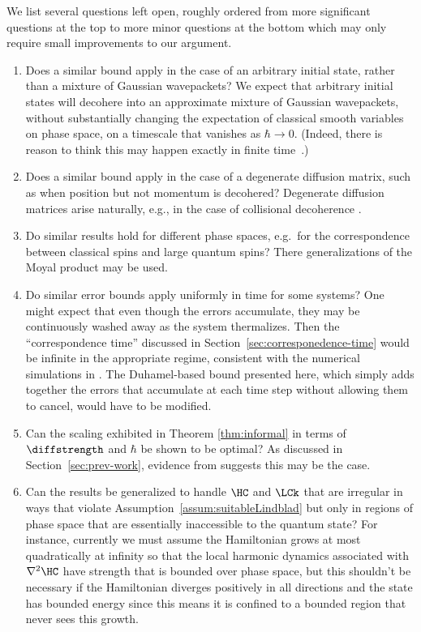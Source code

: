 \documentclass{article}
\numberwithin{equation}{section}
\begin{document}
We list several questions left open, roughly ordered from more significant questions at the top to more minor questions at the bottom which may only require small improvements to our argument.
\begin{enumerate}
    \item  Does a similar bound apply in the case of an arbitrary initial state, rather than a mixture of Gaussian wavepackets? We expect that arbitrary initial states will decohere into an approximate mixture of Gaussian wavepackets, without substantially changing the expectation of classical smooth variables on phase space, on a timescale that vanishes as $\hbar\to 0$.  (Indeed, there is reason to think this may happen exactly in finite time~\cite{diosi2002exact, brodier2004symplectic, eisert2004exact, riedel2016quantum}.) 
    \item Does a similar bound apply in the case of a degenerate diffusion matrix, such as when position but not momentum is decohered? Degenerate diffusion matrices arise naturally, e.g., in the case of collisional decoherence \cite{joos1985emergence, gallis1990environmental, schlosshauer2008decoherence}. 
    \item Do similar results hold for different phase spaces, e.g.\ for the correspondence between classical spins and large quantum spins? There generalizations of the Moyal product may be used. 
    \item Do similar error bounds apply uniformly in time for some systems?  One might expect that even though the errors accumulate, they may be continuously washed away as the system thermalizes.  Then the ``correspondence time'' discussed in Section~\ref{sec:corresponedence-time} would be infinite in the appropriate regime, consistent with the numerical simulations in \cite{toscano2005decoherence}. The Duhamel-based bound presented here, which simply adds together the errors that accumulate at each time step without allowing them to cancel, would have to be modified.
    \item Can the scaling exhibited in Theorem \ref{thm:informal} in terms of $\diffstrength$ and $\hbar$ be shown to be optimal? As discussed in Section~\ref{sec:prev-work}, evidence from \cite{toscano2005decoherence,toscano2006quantum,wisniacki2009scaling} suggests this may be the case.
    \item Can the results be generalized to handle $\HC$ and $\LCk$ that are irregular in ways that violate Assumption~\ref{assum:suitableLindblad} but only in regions of phase space that are essentially inaccessible to the quantum state? For instance, currently we must assume the Hamiltonian grows at most quadratically at infinity so that the local harmonic dynamics associated with $\nabla^2 \HC$ have strength that is bounded over phase space, but this shouldn't be necessary if the Hamiltonian diverges positively in all directions and the state has bounded energy since this means it is confined to a bounded region that never sees this growth.

\end{enumerate}
\end{document}
